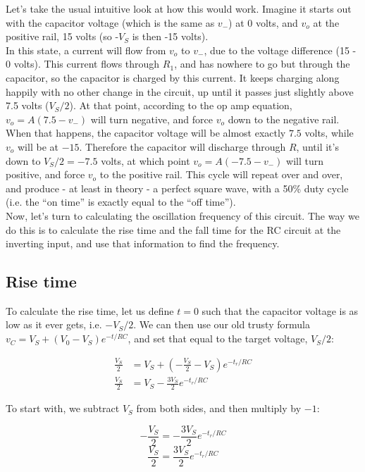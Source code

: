 \documentclass[12pt,a4paper]{report}
\begin{document}
Let's take the usual intuitive look at how this would work. Imagine it starts out with the capacitor voltage (which is the same as $v_-$) at 0 volts, and $v_o$ at the positive rail, 15 volts (so -$V_S$ is then -15 volts).\\
In this state, a current will flow from $v_o$ to $v_-$, due to the voltage difference (15 - 0 volts). This current flows through $R_1$, and has nowhere to go but through the capacitor, so the capacitor is charged by this current. It keeps charging along happily with no other change in the circuit, up until it passes just slightly above 7.5 volts ($V_S/2$). At that point, according to the op amp equation, $v_o = A(7.5 - v_-)$ will turn negative, and force $v_o$ down to the negative rail.\\
When that happens, the capacitor voltage will be almost exactly $7.5$ volts, while $v_o$ will be at $-15$. Therefore the capacitor will discharge through $R$, until it's down to $V_S/2 = -7.5$ volts, at which point $v_o = A(-7.5 - v_-)$ will turn positive, and force $v_o$ to the positive rail. This cycle will repeat over and over, and produce - at least in theory - a perfect square wave, with a 50\% duty cycle (i.e. the ``on time'' is exactly equal to the ``off time'').\\

Now, let's turn to calculating the oscillation frequency of this circuit. The way we do this is to calculate the rise time and the fall time for the RC circuit at the inverting input, and use that information to find the frequency.

\subsection{Rise time}
To calculate the rise time, let us define $t = 0$ such that the capacitor voltage is as low as it ever gets, i.e. $-V_S/2$. We can then use our old trusty formula $v_C = V_S + (V_0 - V_S)e^{-t/RC}$, and set that equal to the target voltage, $V_S/2$:

\begin{align*} 
 \frac{V_S}{2} &= V_S + (-\frac{V_S}{2} - V_S) e^{-t_r/RC}\\
 \frac{V_S}{2} &= V_S - \frac{3V_S}{2} e^{-t_r/RC}
\end{align*}

To start with, we subtract $V_S$ from both sides, and then multiply by $-1$:

\[ -\frac{V_S}{2} = - \frac{3V_S}{2} e^{-t_r/RC} \]
\[ \frac{V_S}{2} = \frac{3V_S}{2} e^{-t_r/RC} \]
\end{document}
